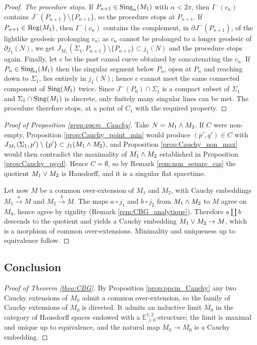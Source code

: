 \documentclass[a4paper,twoside]{article}
\newcommand{\mass}[1]{\mathbb{E}^{1,2}_{#1}}
\begin{document}
\begin{proof}
\emph{The procedure stops.} If $P_{n+1}\in \mathrm{Sing}_\alpha(M_1)$ with $\alpha<2\pi$, then $I^-(c_n)$
contains $J^-(P_{n+1})\setminus\{P_{n+1}\}$, so the procedure stops at $P_{n+1}$. If
$P_{n+1}\in \mathrm{Reg}(M_1)$, then $I^-(c_n)$ contains the complement, in $\partial J^-(P_{n+1})$, of the
lightlike geodesic prolonging $c_n$; as $c_n$ cannot be prolonged to a longer geodesic of $\partial
j_1(N)$, we get $J_{M_1}(\Sigma_1,P_{n+1})\setminus\{P_{n+1}\}\subset j_1(N)$ and the procedure stops
again. Finally, let $c$ be the past causal curve obtained by concatenating the $c_n$. If $P_n\in
\mathrm{Sing}_\alpha(M_1)$ then the singular segment below $P_n$, open at $P_n$ and reaching down to
$\Sigma_1$, lies entirely in $j_1(N)$; hence $c$ cannot meet the same connected component of
$\mathrm{Sing}(M_1)$ twice. Since $J^-(P_0)\cap \Sigma_1$ is a compact subset of $\Sigma_1$ and
$\Sigma_1\cap \mathrm{Sing}(M_1)$ is discrete, only finitely many singular lines can be met. The procedure
therefore stops, at a point of $C_1$ with the required property.
\end{proof}

\begin{proof}[Proof of Proposition \ref{prop:ppcm_Cauchy}]
Take $N=M_1 \wedge M_2$. If $C$ were non-empty, Proposition \ref{prop:Cauchy_point_min} would produce
$(p',q')\in C$ with $J_{M_1}(\Sigma_1,p')\setminus\{p'\}\subset j_1(M_1 \wedge M_2)$, and Proposition
\ref{prop:Cauchy_non_max} would then contradict the maximality of $M_1 \wedge M_2$ established in Proposition
\ref{prop:Cauchy_pgcd}. Hence $C=\emptyset$, so by Remark \ref{rem:non_separe_cas} the quotient
$M_1 \vee M_2$ is Hausdorff, and it is a singular flat spacetime.

Let now $M$ be a common over-extension of $M_1$ and $M_2$, with Cauchy embeddings
$M_1\xrightarrow{a}M$ and $M_2\xrightarrow{b}M$. The maps $a\circ j_1$ and $b\circ j_2$ from $M_1 \wedge M_2$
to $M$ agree on $M_0$, hence agree by rigidity (Remark \ref{rem:CBG_analytique}). Therefore
$a\coprod b$ descends to the quotient and yields a Cauchy embedding $M_1 \vee M_2\rightarrow M$, which is a
morphism of common over-extensions. Minimality and uniqueness up to equivalence follow.
\end{proof}

\subsection{Conclusion}

\begin{proof}[Proof of Theorem \ref{theo:CBG}]
By Proposition \ref{prop:ppcm_Cauchy} any two Cauchy extensions of $M_0$ admit a common
over-extension, so the family of Cauchy extensions of $M_0$ is directed. It admits an inductive limit
$\overline{M_0}$ in the category of Hausdorff spaces endowed with a $\mass{\geq0}$-structure; the
limit is maximal and unique up to equivalence, and the natural map $M_0\rightarrow \overline{M_0}$ is
a Cauchy embedding.
\end{proof}
\end{document}
